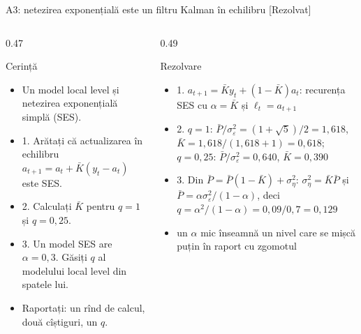 \begin{frame}{A3: netezirea exponențială este un filtru Kalman în echilibru [Rezolvat]}
\itemsize{\scriptsize}
\begin{columns}[T]
\begin{column}{0.47\textwidth}
\begin{block}{Cerință}
\begin{itemize}
    \item Un model local level și netezirea exponențială simplă (SES).
    \item 1. Arătați că actualizarea în echilibru $a_{t+1} = a_t + \bar K(y_t - a_t)$ este SES.
    \item 2. Calculați $\bar K$ pentru $q = 1$ și $q = 0{,}25$.
    \item 3. Un model SES are $\alpha = 0{,}3$. Găsiți $q$ al modelului local level din spatele lui.
    \item Raportați: un rînd de calcul, două cîștiguri, un $q$.
\end{itemize}
\end{block}
\end{column}
\begin{column}{0.49\textwidth}
\begin{exampleblock}{Rezolvare}
\begin{itemize}
    \item 1. $a_{t+1} = \bar Ky_t + (1 - \bar K)a_t$: recurența SES cu $\alpha = \bar K$ și $\ell_t = a_{t+1}$
    \item 2. $q = 1$: $\bar P/\sigma^2_\varepsilon = (1 + \sqrt5)/2 = 1{,}618$, $\bar K = 1{,}618/(1{,}618 + 1) = 0{,}618$; $q = 0{,}25$: $\bar P/\sigma^2_\varepsilon = 0{,}640$, $\bar K = 0{,}390$
    \item 3. Din $\bar P = \bar P(1 - \bar K) + \sigma^2_\eta$: $\sigma^2_\eta = \bar K\bar P$ și $\bar P = \alpha\sigma^2_\varepsilon/(1 - \alpha)$, deci $q = \alpha^2/(1 - \alpha) = 0{,}09/0{,}7 = 0{,}129$
    \item un $\alpha$ mic înseamnă un nivel care se mișcă puțin în raport cu zgomotul
\end{itemize}
\end{exampleblock}
\end{column}
\end{columns}
\end{frame}


